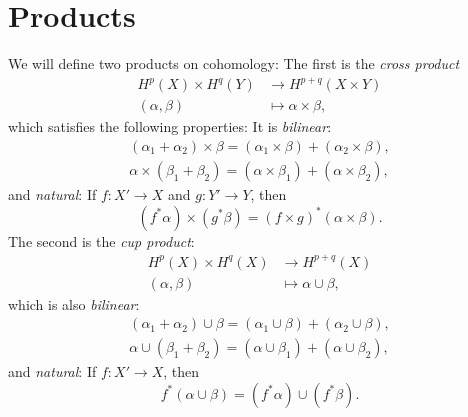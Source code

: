 \section{Products}

\begin{remark}
  We will define two products on cohomology:
  The first is the \emph{cross product}
  \begin{align*}
    H^p(X) \times H^q(Y)
    &\longrightarrow H^{p + q}(X \times Y) \\
    (\alpha, \beta)
    &\longmapsto \alpha \times \beta,
  \end{align*}
  which satisfies the following properties:
  It is \emph{bilinear}:
  \begin{align*}
    (\alpha_1 + \alpha_2) \times \beta
    = (\alpha_1 \times \beta) + (\alpha_2 \times \beta), \\
    \alpha \times (\beta_1 + \beta_2)
    = (\alpha \times \beta_1) + (\alpha \times \beta_2),
  \end{align*}
  and \emph{natural}: If $f : X' \to X$ and $g : Y' \to Y$,
  then
  \[
    (f^* \alpha) \times (g^* \beta)
    = (f \times g)^*(\alpha \times \beta).
  \]
  The second is the \emph{cup product}:
  \begin{align*}
    H^p(X) \times H^q(X)
    &\longrightarrow H^{p + q}(X) \\
    (\alpha, \beta)
    &\longmapsto \alpha \cup \beta,
  \end{align*}
  which is also \emph{bilinear}:
  \begin{align*}
    (\alpha_1 + \alpha_2) \cup \beta
    = (\alpha_1 \cup \beta) + (\alpha_2 \cup \beta), \\
    \alpha \cup (\beta_1 + \beta_2)
    = (\alpha \cup \beta_1) + (\alpha \cup \beta_2),
  \end{align*}
  and \emph{natural}: If $f : X' \to X$, then
  \[
    f^*(\alpha \cup \beta)
    = (f^* \alpha) \cup (f^* \beta).
  \]
\end{remark}

